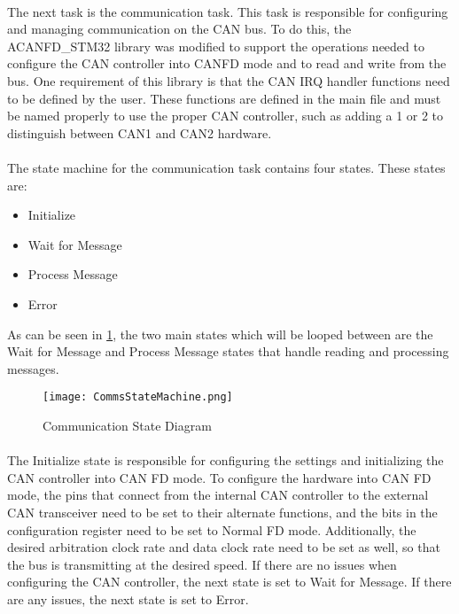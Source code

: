 \paragraph{}
The next task is the communication task.
This task is responsible for configuring and managing communication on the CAN bus.
To do this, the ACANFD\_STM32 library \cite{ACANFDGithub} was modified to support the operations needed to configure the CAN controller into CANFD mode and to read and write from the bus.
One requirement of this library is that the CAN IRQ handler functions need to be defined by the user.
These functions are defined in the main file and must be named properly to use the proper CAN controller, such as adding a 1 or 2 to distinguish between CAN1 and CAN2 hardware.

\paragraph{}
The state machine for the communication task contains four states.
These states are:
\begin{itemize}
	\item Initialize
	\item Wait for Message
	\item Process Message
	\item Error
\end{itemize}
As can be seen in \cref{fig:CommsDiagram}, the two main states which will be looped between are the Wait for Message and Process Message states that handle reading and processing messages.

\begin{figure}[H]
	\centering
	\texttt{[image: CommsStateMachine.png]}
	\caption{Communication State Diagram}
	\label{fig:CommsDiagram}
\end{figure}

\paragraph{}
The Initialize state is responsible for configuring the settings and initializing the CAN controller into CAN FD mode.
To configure the hardware into CAN FD mode, the pins that connect from the internal CAN controller to the external CAN transceiver need to be set to their alternate functions, and the bits in the configuration register need to be set to Normal FD mode.
Additionally, the desired arbitration clock rate and data clock rate need to be set as well, so that the bus is transmitting at the desired speed.
If there are no issues when configuring the CAN controller, the next state is set to Wait for Message.
If there are any issues, the next state is set to Error.

